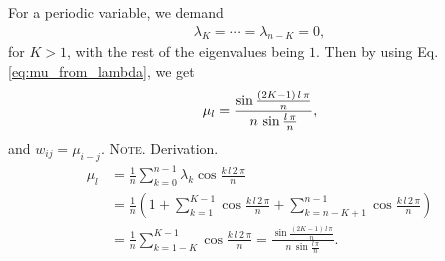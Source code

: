 \documentclass[reprint, superscriptaddress, floatfix]{revtex4-1}
\newcommand{\note}[1]{{\color{DarkGreen}\footnotesize \textsc{Note.} #1}}
\begin{document}
For a periodic variable, we demand
%
$$
\begin{aligned}
\lambda_{K} = \cdots = \lambda_{n-K} = 0,
\end{aligned}
$$
for $K > 1$,
with the rest of the eigenvalues being $1$.
%
Then by using
Eq. \eqref{eq:mu_from_lambda},
we get
\begin{equation}
  \mu_l
  =
  \frac{
    \sin
    \frac{ (2 K - 1) \, l \, \pi }
         {              n        }
  }
  {
    n \, \sin \frac{ l \, \pi } { n }
  }
  ,
\notag
\end{equation}
and $w_{ij} = \mu_{i-j}$.
%
\note{Derivation.
$$
\begin{aligned}
\mu_l
&=
\frac 1 n \sum_{k = 0}^{n-1} \lambda_k \cos \frac{ k \, l \, 2 \, \pi } { n }
\\
&=
\frac{1}{n}
\left(
  1 +
  \sum_{k=1}^{K-1}
  \cos \frac { k \, l \, 2 \, \pi } { n }
  +
  \sum_{k=n-K+1}^{n-1}
  \cos \frac { k \, l \, 2 \, \pi } { n }
\right)
\\
&=
\frac 1 n
\sum_{k=1-K}^{K-1}
\cos \frac { k \, l \, 2 \, \pi } { n }
=
  \frac{
    \sin
    \frac{ (2 K - 1) \, l \, \pi }
         {              n        }
  }
  {
    n \, \sin \frac{ l \, \pi } { n }
  }
.
\end{aligned}
$$
}
\end{document}
